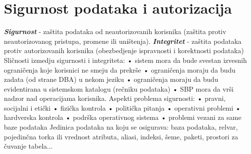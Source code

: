\documentclass{article}
\begin{document}
\section{Sigurnost podataka i autorizacija}
\textit{\textbf{Sigurnost}} - zaštita podataka od
neautorizovanih korisnika (zaštita protiv neautorizovanog
pristupa, promene ili uništenja).
\newline
\textit{\textbf{Integritet}} - zaštita podataka protiv
autorizovanih korisnika (obezbedjenje ispravnosti i korektnosti
podataka)
\newline
Sličnosti izmedju sigurnosti i integriteta: 
\newline \hspace*{0.4cm} • sistem mora da bude
svestan izvesnih ograničenja koje korisnici ne smeju da prekrše
\newline \hspace*{0.4cm} • ograničenja moraju da budu zadata (od
strane DBA) u nekom jeziku
\newline \hspace*{0.4cm} • ograničenja moraju da budu
evidentirana u sistemskom katalogu (rečniku podataka)
\newline \hspace*{0.4cm} • SBP mora da vrši nadzor nad
operacijama korisnika.
\newline
Aspekti problema sigurnosti:
\newline \hspace*{0.4cm} • pravni, socijalni i etički  
\newline \hspace*{0.4cm} • fizička kontrola
\newline \hspace*{0.4cm} • politička pitanja
\newline \hspace*{0.4cm} • operativni problemi
\newline \hspace*{0.4cm} • hardverska kontrola
\newline \hspace*{0.4cm} • podrška operativnog sistema
\newline \hspace*{0.4cm} • problemi vezani za same baze podataka
\newline
Jedinica podataka na koju se osigurava: baza podataka, relvar,
pojedinčna torka ili vrednost atributa, aliasi, indeksi, šeme,
paketi, prostori za čuvanje tabela...
\end{document}
